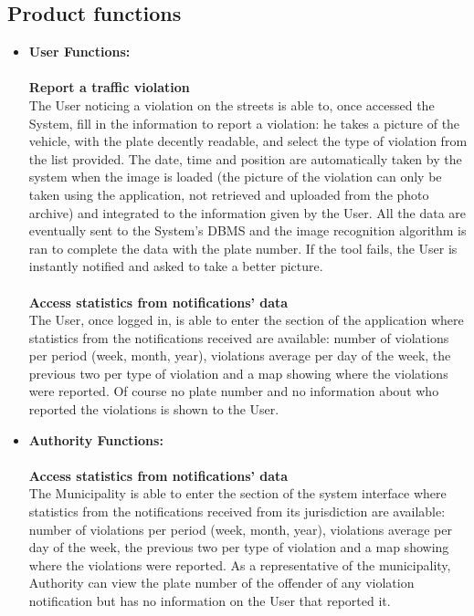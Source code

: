 \documentclass {article}
\begin{document}
	\subsection{Product functions} 
	\begin{itemize}
	\item {\bf User Functions:} \\ \\
		{\bf Report a traffic violation} \\
		The User noticing a violation on the streets is able to, once accessed the System, fill in the information to report a violation: he takes a picture of the vehicle, with the plate decently readable, and select the type of violation from the list provided. The date, time and position are automatically taken by the system when the image is loaded (the picture of the violation can only be taken using the application, not retrieved and uploaded from the photo archive) and integrated to the information given by the User. All the data are eventually sent to the System’s DBMS and the image recognition algorithm is ran to complete the data with the plate number. If the tool fails, the User is instantly notified and asked to take a better picture. \\ \\ 
		{\bf Access statistics from notifications' data}\\
		The User, once logged in, is able to enter the section of the application where statistics from the notifications received are available: number of violations per period (week, month, year), violations average per day of the week, the previous two per type of violation and a map showing where the violations were reported. Of course no plate number and no information about who reported the violations is shown to the User.\\ 
	\item {\bf Authority Functions:} \\ \\
		{\bf Access statistics from notifications' data}\\
		The Municipality is able to enter the section of the system interface where statistics from the notifications received from its jurisdiction are available: number of violations per period (week, month, year), violations average per day of the week, the previous two per type of violation and a map showing where the violations were reported. As a representative of the municipality, Authority can view the plate number of the offender of any violation notification but has no information on the User that reported it. \\ \\

\end{itemize}
\end{document}
